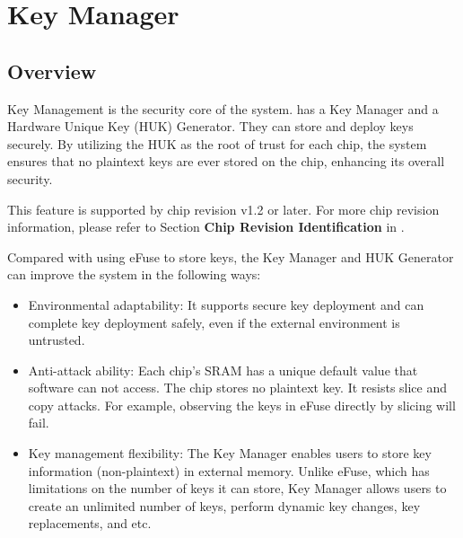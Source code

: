 \documentclass[main\_\_EN.tex]{subfiles}
\begin{document}

\ifglobal
\else
    \listoftodos
    {\let\clearpage\relax \listofdonetodos}
    \tableofcontents
\fi



\hypertarget{keymng}{}
\chapter{Key Manager}
\label{mod:keymng}

\section{Overview}
Key Management is the security core of the system. \chipname{} has a Key Manager and a Hardware Unique Key (HUK) Generator. They can store and deploy keys securely. By utilizing the HUK as the root of trust for each chip, the system ensures that no plaintext keys are ever stored on the chip, enhancing its overall security.

\begin{tiplisting}
    This feature is supported by chip revision v1.2 or later. For more chip revision information, please refer to Section \textbf{Chip Revision Identification} in \doclinkerrataEN.
\end{tiplisting}

Compared with using eFuse to store keys, the Key Manager and HUK Generator can improve the system in the following ways:
\begin{itemize}
    \item Environmental adaptability: It supports secure key deployment and can complete key deployment safely, even if the external environment is untrusted.
    \item Anti-attack ability: Each chip's SRAM has a unique default value that software can not access. The chip stores no plaintext key. It resists slice and copy attacks. For example, observing the keys in eFuse directly by slicing will fail.
    \item Key management flexibility: The Key Manager enables users to store key information (non-plaintext) in external memory. Unlike eFuse, which has limitations on the number of keys it can store, Key Manager allows users to create an unlimited number of keys, perform dynamic key changes, key replacements, and etc.
\end{itemize}
\end{document}
